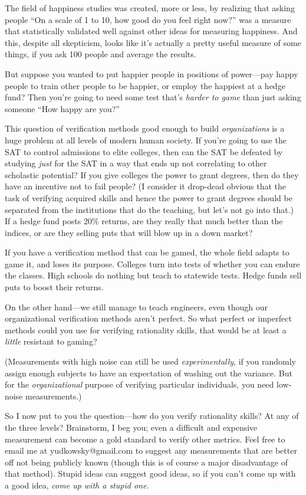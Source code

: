 {
 The field of happiness studies was created, more or less, by
realizing that asking people ``On a scale of 1 to 10,
how good do you feel right now?'' was a measure that
statistically validated well against other ideas for measuring
happiness. And this, despite all skepticism, looks like
it's actually a pretty useful measure of some things,
if you ask 100 people and average the results.}

{
 But suppose you wanted to put happier people in positions of
power---pay happy people to train other people to be happier, or employ
the happiest at a hedge fund? Then you're going to need
some test that's \textit{harder to game} than just
asking someone ``How happy are
you?''}

{
 This question of verification methods good enough to build
\textit{organizations} is a huge problem at all levels of modern human
society. If you're going to use the SAT to control
admissions to elite colleges, then can the SAT be defeated by studying
\textit{just} for the SAT in a way that ends up not correlating to
other scholastic potential? If you give colleges the power to grant
degrees, then do they have an incentive not to fail people? (I consider
it drop-dead obvious that the task of verifying acquired skills and
hence the power to grant degrees should be separated from the
institutions that do the teaching, but let's not go
into that.) If a hedge fund posts 20\% returns, are they really that
much better than the indices, or are they selling puts that will blow
up in a down market?}

{
 If you have a verification method that can be gamed, the whole
field adapts to game it, and loses its purpose. Colleges turn into
tests of whether you can endure the classes. High schools do nothing
but teach to statewide tests. Hedge funds sell puts to boost their
returns.}

{
 On the other hand---we still manage to teach engineers, even
though our organizational verification methods aren't
perfect. So what perfect or imperfect methods could you use for
verifying rationality skills, that would be at least a \textit{little}
resistant to gaming?}

{
 (Measurements with high noise can still be used
\textit{experimentally}, if you randomly assign enough subjects to have
an expectation of washing out the variance. But for the
\textit{organizational} purpose of verifying particular individuals,
you need low-noise measurements.)}

{
 So I now put to you the question---how do you verify rationality
skills? At any of the three levels? Brainstorm, I beg you; even a
difficult and expensive measurement can become a gold standard to
verify other metrics. Feel free to email me at yudkowsky@gmail.com to
suggest any measurements that are better off not being publicly known
(though this is of course a major disadvantage of that method). Stupid
ideas can suggest good ideas, so if you can't come up
with a good idea, \textit{come up with a stupid one.}}

